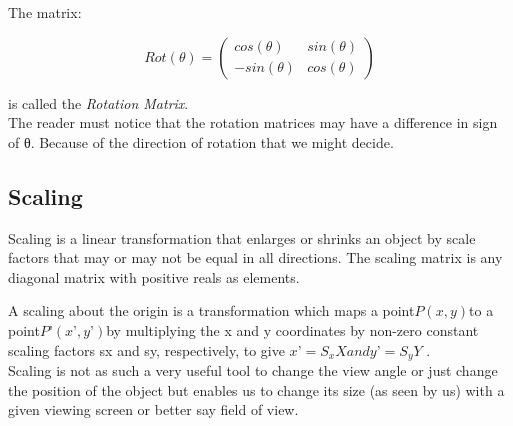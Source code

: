 \documentclass[12pt]{report}
\begin{document}
The matrix:

\[ Rot(\theta) = \begin{pmatrix}
cos(\theta) & sin(\theta) \\
-sin(\theta) & cos(\theta)
\end{pmatrix} \]

is called the \textit{Rotation Matrix}.\\


The reader must notice that the rotation matrices may have a difference in sign of θ. Because of the direction of rotation that we might decide.\\

\subsection{Scaling}

Scaling is a linear transformation that enlarges or shrinks an object by scale factors that may or may not be equal in all directions. The scaling matrix is any diagonal matrix with positive reals as elements.\\
\vspace{0.3cm}

A scaling about the origin is a transformation which maps a point$ P(x, y) $to a point$ P’ (x’ , y’ ) $by multiplying the x and y coordinates by non-zero constant scaling factors sx and sy, respectively, to give $ x’ = S_{x} X and y’ = S_{y} Y$ .
\vspace{0.3cm}
\\

Scaling is not as such a very useful tool to change the view angle or just change the position of the object but enables us to change its size (as seen by us) with a given viewing screen or better say field of view.




\end{document}
